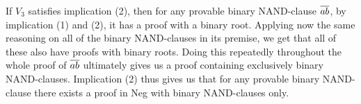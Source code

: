 If $V_3$ satisfies implication (2), then for any provable binary NAND-clause $\ol{ab}$, by implication (1) and (2), it has a proof with a binary root.
Applying now the same reasoning on all of the binary NAND-clauses in its premise, we get that all of these also have proofs with binary roots.
Doing this repeatedly throughout the whole proof of $\ol{ab}$ ultimately gives us a proof containing exclusively binary NAND-clauses.
Implication (2) thus gives us that for any provable binary NAND-clause there exists a proof in Neg with binary NAND-clauses only.
